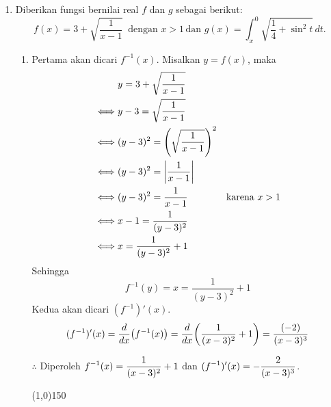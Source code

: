 \begin{enumerate}[leftmargin=*, label={\arabic*}.]
\item Diberikan fungsi bernilai real $f$ dan $g$ sebagai berikut:
\[
f(x)=3+\sqrt{\frac{1}{x-1}}\,\text{ dengan }x > 1\,\text{dan }g(x)=
\int_{x}^{0}\sqrt{\frac{1}{4}+\sin^{2}t}\,dt.
\]
    \begin{enumerate}[label={\alph*}.]
    \item Pertama akan dicari $f^{-1}(x)$.
    Misalkan $y=f(x)$, maka
    \begin{align*}
        &y = 3+\sqrt{\frac{1}{x-1}}\\
        \iff &y-3 = \sqrt{\frac{1}{x-1}}\\
        \iff &(y-3)^{2} = \brk*{\sqrt{\frac{1}{x-1}}}^2\\
        \iff &(y-3)^{2} = \abs*{\frac{1}{x-1}}\\
        \iff &(y-3)^{2} = \frac{1}{x-1}
        &\text{karena }x>1\\
        \iff &x-1=\frac{1}{(y-3)^{2}}\\
        \iff &x=\frac{1}{(y-3)^{2}}+1
    \end{align*}
    Sehingga
    \[
    f^{-1}(y) = x = \frac{1}{(y-3)^{2}}+1
    \]
    Kedua akan dicari $(f^{-1})'(x)$.
    \[
        (f^{-1})'(x) = \drv{x}{f^{-1}(x)}
        = \drv{x}{\frac{1}{(x-3)^{2}}+1}=\frac{(-2)}{(x-3)^{3}}
    \]

    $\therefore$ Diperoleh $\ds f^{-1}(x) = \frac{1}{(x-3)^{2}}+1$ dan 
    $\ds (f^{-1})'(x) =-\frac{2}{(x-3)^{3}}$.


\begin{center}\line(1,0){150}\end{center}



\end{enumerate}
\end{enumerate}
